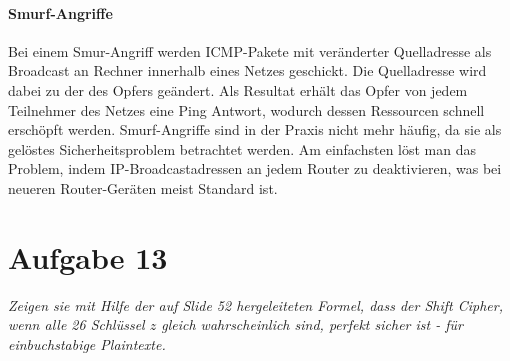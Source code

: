 \documentclass{article}
\begin{document}
    \paragraph{Smurf-Angriffe} Bei einem Smur-Angriff werden ICMP-Pakete mit veränderter Quelladresse als Broadcast 
    an Rechner innerhalb eines Netzes geschickt. Die Quelladresse wird dabei zu der des Opfers geändert. Als Resultat
    erhält das Opfer von jedem Teilnehmer des Netzes eine Ping Antwort, wodurch dessen Ressourcen schnell erschöpft werden.
    Smurf-Angriffe sind in der Praxis nicht mehr häufig, da sie als gelöstes Sicherheitsproblem betrachtet werden. Am einfachsten
    löst man das Problem, indem IP-Broadcastadressen an jedem Router zu deaktivieren, was bei neueren Router-Geräten 
    meist Standard ist.
    \section{Aufgabe 13}
    \textit{Zeigen sie mit Hilfe der auf Slide 52 hergeleiteten Formel, dass der Shift Cipher, wenn
    alle 26 Schlüssel $z$ gleich wahrscheinlich sind, perfekt sicher ist - für einbuchstabige
    Plaintexte.}
\end{document}
